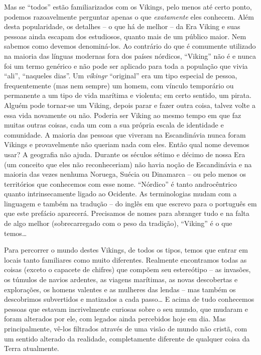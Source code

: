 Mas se ``todos'' estão familiarizados com os Vikings, pelo menos até
certo ponto, podemos razoavelmente perguntar apenas o que
\emph{exatamente} eles conhecem. Além desta popularidade, os detalhes --
o que há de melhor -- da Era Viking e suas pessoas ainda escapam dos
estudiosos, quanto mais de um público maior. Nem sabemos como devemos
denominá-los. Ao contrário do que é comumente utilizado na maioria das
línguas modernas fora dos países nórdicos, ``Viking'' não é e nunca foi
um termo genérico e não pode ser aplicado para toda a população que
vivia ``ali'', ``naqueles dias''. Um \emph{víkingr} ``original'' era um
tipo especial de pessoa, frequentemente (mas nem sempre) um homem, com
vínculo temporário ou permanente a um tipo de vida marítima e violenta;
em certo sentido, um pirata. Alguém pode tornar-se um Viking, depois
parar e fazer outra coisa, talvez volte a essa vida novamente ou não.
Poderia ser Viking ao mesmo tempo em que faz muitas outras coisas, cada
um com a sua própria escala de identidade e comunidade. A maioria das
pessoas que viveram na Escandinávia nunca foram Vikings e provavelmente
não queriam nada com eles. Então qual nome devemos usar? A geografia não
ajuda. Durante os séculos sétimo e décimo de nossa Era (um conceito que
eles não reconheceriam) não havia noção de Escandinávia e na maioria das
vezes nenhuma Noruega, Suécia ou Dinamarca -- ou pelo menos os
territórios que conhecemos com esse nome. ``Nórdico'' é tanto
androcêntrico quanto intrinsecamente ligado ao Ocidente. As
terminologias mudam com a linguagem e também na tradução -- do inglês em
que escrevo para o português em que este prefácio aparecerá. Precisamos
de nomes para abranger tudo e na falta de algo melhor (sobrecarregado
com o peso da tradição), ``Viking'' é o que temos\ldots{}

Para percorrer o mundo destes Vikings, de todos os tipos, temos que
entrar em locais tanto familiares como muito diferentes. Realmente
encontramos todas as coisas (exceto o capacete de chifres) que compõem
seu estereótipo -- as invasões, os túmulos de navios ardentes, as
viagens marítimas, as novas descobertas e explorações, os homens
valentes e as mulheres das lendas -- mas também os descobrimos
subvertidos e matizados a cada passo\ldots{} E acima de tudo conhecemos
pessoas que estavam incrivelmente curiosas sobre o seu mundo, que
mudaram e foram alterados por ele, com legados ainda percebidos hoje em
dia. Mas principalmente, vê-los filtrados através de uma visão de mundo
não cristã, com um sentido alterado da realidade, completamente
diferente de qualquer coisa da Terra atualmente.

